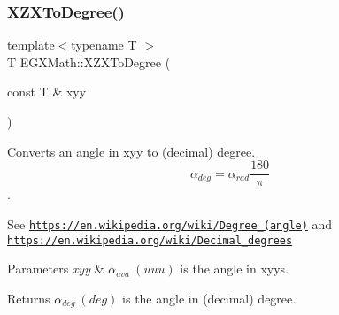 \subsubsection{\texorpdfstring{X\+Z\+X\+To\+Degree()}{XZXToDegree()}}
{\footnotesize\ttfamily template$<$typename T $>$ \\
T E\+G\+X\+Math\+::\+X\+Z\+X\+To\+Degree (\begin{DoxyParamCaption}\item[{const T \&}]{xyy }\end{DoxyParamCaption})}



Converts an angle in xyy to (decimal) degree. \[\alpha_{deg}=\alpha_{rad}\frac{180}{\pi}\]. 

See \href{https://en.wikipedia.org/wiki/Degree_(angle)}{\tt https\+://en.\+wikipedia.\+org/wiki/\+Degree\+\_\+(angle)} and \href{https://en.wikipedia.org/wiki/Decimal_degrees}{\tt https\+://en.\+wikipedia.\+org/wiki/\+Decimal\+\_\+degrees} 
\begin{DoxyParams}{Parameters}
{\em xyy} & $\alpha_{ava}\ (uuu)$ is the angle in xyys. \\
\hline
\end{DoxyParams}
\begin{DoxyReturn}{Returns}
$\alpha_{deg}\ (deg)$ is the angle in (decimal) degree. 
\end{DoxyReturn}
